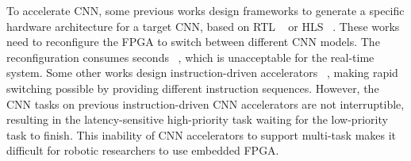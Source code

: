 





To accelerate CNN, some previous works design frameworks to generate a specific hardware architecture for a target CNN, based on  RTL  ~\cite{li_high_2016} or HLS  ~\cite{lu_evaluating_2017}. These works need to reconfigure the FPGA to switch between different CNN models. The reconfiguration consumes seconds  ~\cite{FPGAPerformance}, which is unacceptable for the real-time system.
Some other works design instruction-driven accelerators  ~\cite{yu2018instruction,qiu2016going,guo2017angel,dpu}, making rapid switching possible by providing different instruction sequences. 
However, the CNN tasks on previous instruction-driven CNN accelerators are not interruptible, resulting in the latency-sensitive high-priority task waiting for the low-priority task to finish. 
This inability of CNN accelerators to support multi-task makes it difficult for robotic researchers to use embedded FPGA.